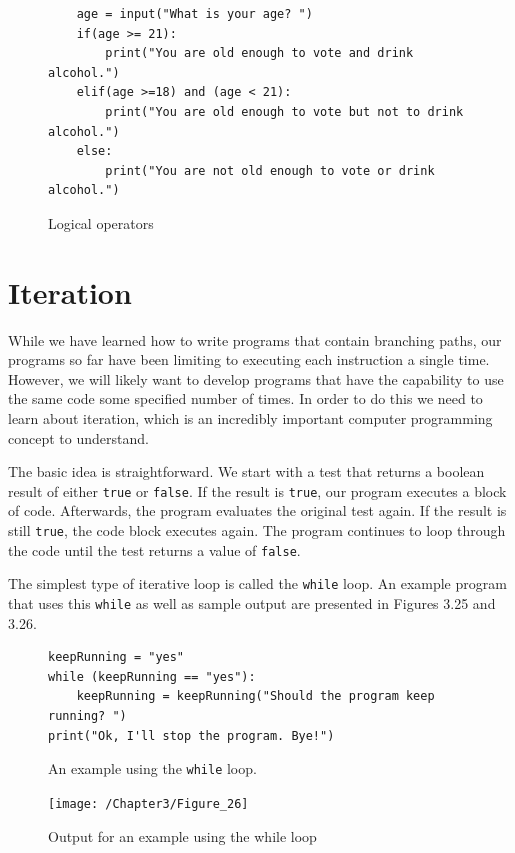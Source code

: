 \documentclass{book}
\begin{document}
\begin{figure}[h]
	\caption{Logical operators}
\begin{lstlisting}
	age = input("What is your age? ")
	if(age >= 21):
		print("You are old enough to vote and drink alcohol.")
	elif(age >=18) and (age < 21):
		print("You are old enough to vote but not to drink alcohol.")
	else:
		print("You are not old enough to vote or drink alcohol.")
\end{lstlisting}
\end{figure}

\section{Iteration}
While we have learned how to write programs that contain branching paths, our programs so far have been limiting to executing each instruction a single time. However, we will likely want to develop programs that have the capability to use the same code some specified number of times. In order to do this we need to learn about iteration, which is an incredibly important computer programming concept to understand.

The basic idea is straightforward. We start with a test that returns a boolean result of either \texttt{true} or \texttt{false}. If the result is \texttt{true}, our program executes a block of code. Afterwards, the program evaluates the original test again. If the result is still \texttt{true}, the code block executes again. The program continues to loop through the code until the test returns a value of \texttt{false}.

The simplest type of iterative loop is called the \texttt{while} loop. An example program that uses this \texttt{while} as well as sample output are presented in Figures 3.25 and 3.26.

\begin{figure}[h]
\caption{An example using the \texttt{while} loop.}
\begin{lstlisting}
keepRunning = "yes"
while (keepRunning == "yes"):
	keepRunning = keepRunning("Should the program keep running? ")
print("Ok, I'll stop the program. Bye!")
\end{lstlisting}
\end{figure}

\begin{figure}[h]
	\caption{Output for an example using the while loop}
	\centering\texttt{[image: /Chapter3/Figure\_26]}
\end{figure}
\end{document}
